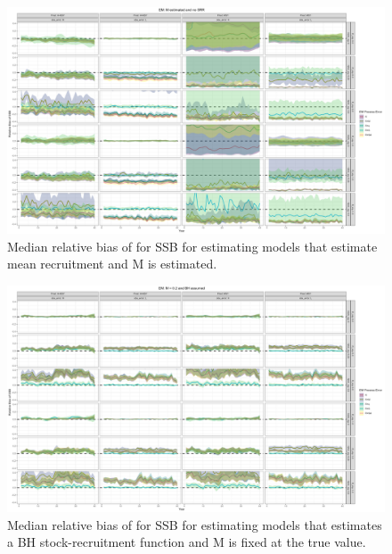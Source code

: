 \documentclass[
  12pt,
]{article}
\begin{document}
\begin{landscape}
\begin{figure}
\caption{Median relative bias of for SSB for estimating models that estimate mean recruitment and M is estimated.}\label{naa_om_em_R_ME_relbias_ssb}
\begin{center}
\includegraphics[width = \textwidth]{naa_om_R_ME_relbias_ssb.png}
\end{center}
\end{figure}
\end{landscape}

\begin{landscape}
\begin{figure}
\caption{Median relative bias of for SSB for estimating models that estimates a BH stock-recruitment function and M is fixed at the true value.}\label{naa_om_em_SR_MF_relbias_ssb}
\begin{center}
\includegraphics[width = \textwidth]{naa_om_SR_MF_relbias_ssb.png}
\end{center}
\end{figure}
\end{landscape}
\end{document}
